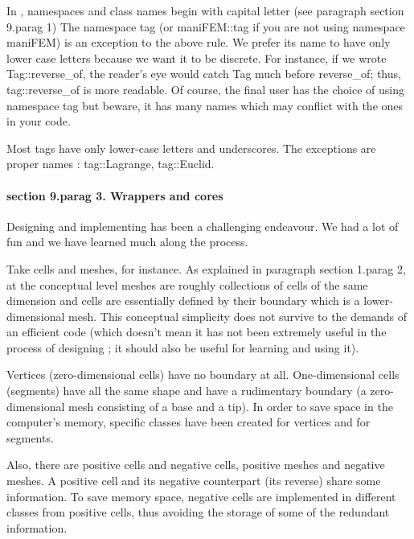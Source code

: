 {In \maniFEM, namespaces and class names begin with capital letter
(see paragraph \numb section 9.\numb parag 1)
The namespace {\codett tag} (or {\codett maniFEM::tag} if you are not
{\codett using namespace maniFEM}) is an exception to the above rule.
We prefer its name to have only lower case letters because we want it to be
discrete. For instance, if we wrote {\codett Tag::reverse\_of},
the reader's eye would catch {\codett Tag} much before {\codett reverse\_of};
thus, {\codett tag::reverse\_of} is more readable.
Of course, the final user has the choice of {\codett using namespace tag}
but beware, it has many names which may conflict with the ones in your code.

Most tags have only lower-case letters and underscores.
The exceptions are proper names : {\codett tag::Lagrange}, {\codett tag::Euclid}.


\paragraph{\numb section 9.\numb parag 3. Wrappers and cores}

Designing and implementing {\maniFEM} has been a challenging endeavour.
We had a lot of fun and we have learned much along the process.

Take cells and meshes, for instance.
As explained in paragraph \numb section 1.\numb parag 2, at the conceptual level meshes
are roughly collections of cells of the same dimension and cells are essentially
defined by their boundary which is a lower-dimensional mesh.
This conceptual simplicity does not survive to the demands of an efficient code
(which doesn't mean it has not been extremely useful in the process of designing \maniFEM;
it should also be useful for learning and using it).

Vertices (zero-dimensional cells) have no boundary at all.
One-dimensional cells (segments) have all the same shape and have a rudimentary boundary
(a zero-dimensional mesh consisting of a {\codett base} and a {\codett tip}).
In order to save space in the computer's memory, specific classes have been created for
vertices and for segments.

Also, there are positive cells and negative cells, positive meshes and negative meshes.
A positive cell and its negative counterpart (its {\codett reverse}) share some information.
To save memory space, negative cells are implemented in different classes from
positive cells, thus avoiding the storage of some of the redundant information.

}
